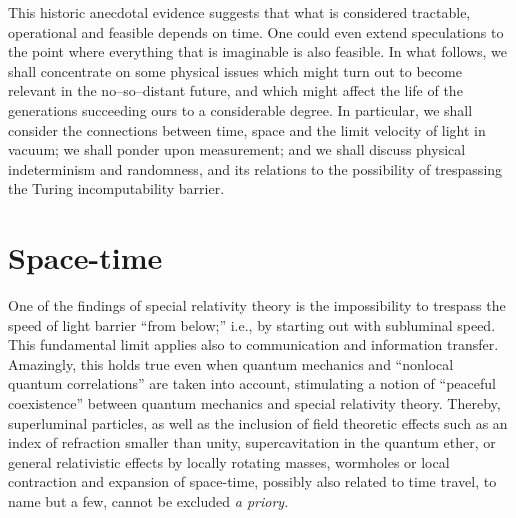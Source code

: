 \documentclass[12pt]{article}
\begin{document}
This historic anecdotal evidence suggests that what is considered tractable,
operational and feasible depends on time.
One could even extend speculations to the point where everything that is imaginable is also feasible.
In what follows, we shall concentrate on some physical issues which might turn out to become relevant in the
no--so--distant future, and which might affect the life of
the generations succeeding ours to a considerable degree.
In particular, we shall consider the connections between time, space and the limit velocity of light in vacuum;
we shall ponder upon measurement;
and we shall discuss physical indeterminism and randomness, and  its relations to the possibility of trespassing the Turing incomputability barrier.

\section{Space-time}

One of the findings of special relativity theory is the impossibility to trespass the speed of light barrier ``from below;''
i.e., by starting out with subluminal speed.
This fundamental limit applies also to communication and information transfer.
Amazingly, this holds true even when quantum mechanics and ``nonlocal quantum correlations'' are taken into account,
stimulating a notion of ``peaceful coexistence'' between quantum mechanics and special relativity theory.
Thereby, superluminal particles,
as well as the inclusion of field theoretic effects such as an index of refraction smaller than unity,
supercavitation in the quantum ether,
or general relativistic effects by locally rotating masses,
wormholes or local contraction and expansion of space-time,
possibly also related to time travel,
to name but a few, cannot be  excluded {\it a priory.}


\end{document}
